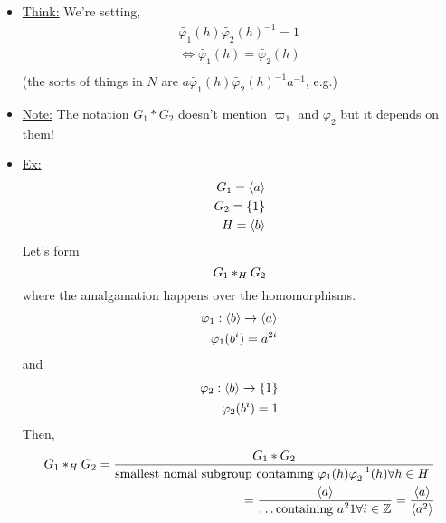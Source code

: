 \documentclass[../notes.tex]{subfiles}
\begin{document}
\begin{itemize}
    \item \underline{Think:} We're setting,
        \begin{align*}
            \tilde{\varphi_1}(h)\tilde{\varphi_2}(h)^{-1}=1\\
            \iff \tilde{\varphi_1}(h)=\tilde{\varphi_2}(h)\\
        \end{align*}
        (the sorts of things in $N$ are $a\tilde{\varphi_1}(h)\tilde{\varphi_2}(h)^{-1}a^{-1}$, e.g.)
    \item \underline{Note:} The notation $G_1*G_2$ doesn't mention $\varpi_1$ and $\varphi_2$
        but it depends on them!
    \item \underline{Ex:}
        \begin{align*}
            G_1=\langle a \rangle\\
            G_2=\{1\}\\
            H=\langle b \rangle\\
        \end{align*}
        Let's form
        \[
            G_1*_{H}G_2\\
        \]
        where the amalgamation happens over the homomorphisms.
        \begin{align*}
            \varphi_1: \langle b \rangle\rightarrow\langle a \rangle\\
            \varphi_1(b^i)=a^{2i}\\
        \end{align*}
        and
        \begin{align*}
            \varphi_2: \langle b \rangle\rightarrow\{1\}\\
            \varphi_2(b^i)=1\\
        \end{align*}
        Then,
        \begin{align*}
            G_1*_{H}G_2=\frac{G_1*G_2}{
                \text{smallest nomal subgroup containing $\varphi_1(h)\varphi_2^{-1}(h)
                    \forall h\in H$
                }
            }\\
            =\frac{\langle a \rangle}{\dots \text{containing $a^2 1\forall i\in \mathbb{Z}$}}=
            \frac{\langle a \rangle}{\langle a^2 \rangle}\\
        \end{align*}
\end{itemize}
\end{document}
